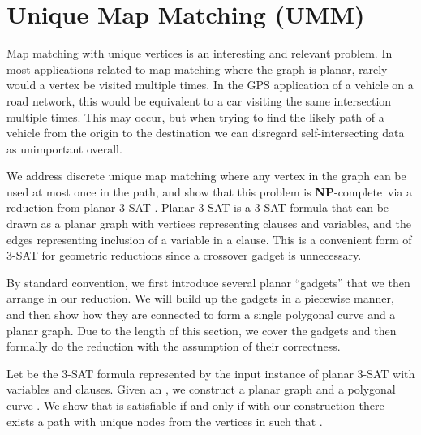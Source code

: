 \documentclass{article}[11pt]
\newcommand{\npc}{\textbf{NP}-complete}
\begin{document}
\section{Unique Map Matching (UMM)} \label{sec:ummk}



Map matching with unique vertices is an interesting and relevant problem.
In most applications related to map matching where the graph is 
planar, rarely would a vertex be visited multiple times.  In the 
GPS application of a vehicle on a road network, this would be equivalent to a car 
visiting the same intersection multiple times.  This may occur, but when trying to 
find the likely path of a vehicle from the origin to the destination we can
disregard self-intersecting data as unimportant overall.  


















We address discrete unique map matching where any vertex in the graph can be used
at most once in the path, and show that this problem is \npc\ 
via a reduction from planar 3-SAT \cite{Lichtenstein:1982:SIAM}. Planar 3-SAT is
a 3-SAT formula that can be drawn as a planar graph with vertices representing clauses
and variables, and the edges representing inclusion of a variable in a clause.  
This is a convenient form of 3-SAT for geometric reductions since 
a crossover gadget is unnecessary.

By standard convention, we first introduce several
planar ``gadgets'' that we then arrange in our reduction.  We will build up the gadgets in
a piecewise manner, and then show how they are connected to form a single polygonal curve and a planar graph.
Due to the length of this section, we cover the gadgets and then formally do the
reduction with the assumption of their correctness.
  
Let  be the 3-SAT formula represented by the input instance of planar 3-SAT with  variables 
and  clauses. 
Given an , we construct a planar graph  and a polygonal curve .
We show that  is satisfiable if and only if with our construction there exists a path 
 with unique nodes from the vertices in  such that .
\end{document}
